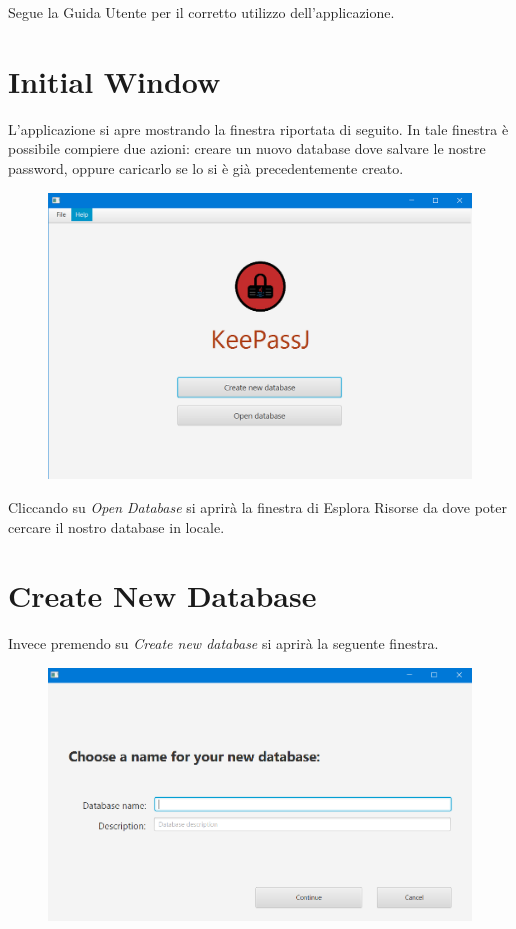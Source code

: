 \documentclass[a4paper,12pt]{report}
\begin{document}
Segue la Guida Utente per il corretto utilizzo dell'applicazione.

\section*{Initial Window}
L’applicazione si apre mostrando la finestra riportata di seguito. In tale finestra è possibile compiere due azioni: creare un nuovo database dove salvare le nostre password, oppure caricarlo se lo si è già precedentemente creato.

\begin{figure}[h]
\centering{}
\includegraphics[width=\textwidth]{user-manual/1}
\end{figure}

Cliccando su \textit{Open Database} si aprirà la finestra di Esplora Risorse da dove poter cercare il nostro database in locale.


\section*{Create New Database}
Invece premendo su \textit{Create new database} si aprirà la seguente finestra.

\begin{figure}[h]
\centering{}
\includegraphics[width=\textwidth]{user-manual/2}
\end{figure}
\end{document}
